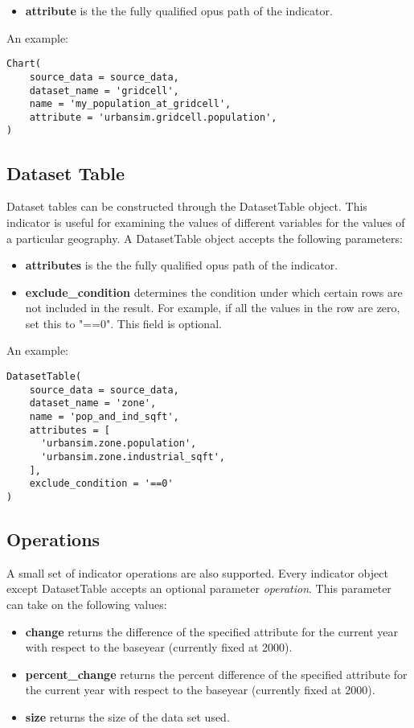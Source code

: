 \begin{itemize}
\tight
\item {\bf attribute} is the the fully qualified opus path of the indicator. 
\end{itemize}

An example:
\begin{verbatim}
Chart(
    source_data = source_data,
    dataset_name = 'gridcell',
    name = 'my_population_at_gridcell',
    attribute = 'urbansim.gridcell.population',
)
\end{verbatim}

\subsection{Dataset Table}
Dataset tables can be constructed through the DatasetTable object. 
This indicator is useful for examining the values of different 
variables for the values of a particular geography. 
A DatasetTable object accepts the following parameters:

\begin{itemize}
\tight
\item {\bf attributes} is the the fully qualified opus path of the indicator.
\item {\bf exclude_condition} determines the condition under which certain rows 
are not included in the result. For example, if all the values in the row 
are zero, set this to "==0". This field is optional.
\end{itemize}

An example:
\begin{verbatim}
DatasetTable(
    source_data = source_data,
    dataset_name = 'zone',
    name = 'pop_and_ind_sqft',
    attributes = [ 
      'urbansim.zone.population',
      'urbansim.zone.industrial_sqft',                     
    ],
    exclude_condition = '==0' 
)
\end{verbatim}

\subsection{Operations}

A small set of indicator operations are also supported. 
Every indicator object except DatasetTable 
accepts an optional parameter \emph{operation}. This parameter can take on the
following values:

\begin{itemize}
\tight
  \item {\bf change} returns the difference of the specified
  attribute for the current year with respect to the baseyear (currently fixed
  at 2000).
  \item {\bf percent_change} returns the percent difference of the specified
  attribute for the current year with respect to the baseyear (currently fixed
  at 2000). 
  \item {\bf size} returns the size of the data set used.
\end{itemize}

